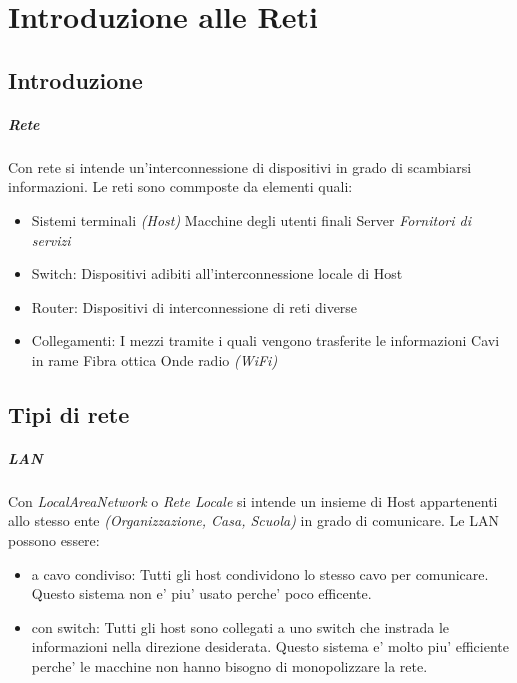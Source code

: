 \chapter{Introduzione alle Reti}

\section{Introduzione}

\paragraph{Rete}

Con rete si intende un'interconnessione di dispositivi in grado di scambiarsi informazioni.
Le reti sono commposte da elementi quali:
\begin{itemize}
    \item Sistemi terminali \textit{(Host)}
    \subitem Macchine degli utenti finali
    \subitem Server \textit{Fornitori di servizi}
    \item Switch: Dispositivi adibiti all'interconnessione locale di Host
    \item Router: Dispositivi di interconnessione di reti diverse
    \item Collegamenti: I mezzi tramite i quali vengono trasferite le informazioni
    \subitem Cavi in rame
    \subitem Fibra ottica
    \subitem Onde radio \textit{(WiFi)}
\end{itemize}

\section{Tipi di rete}
\paragraph{LAN}
Con \textit{LocalAreaNetwork} o \textit{Rete Locale} si intende un insieme di Host appartenenti allo stesso ente \textit{(Organizzazione, Casa, Scuola)} in grado di comunicare.\newline
Le LAN possono essere:
\begin{itemize}
    \item a cavo condiviso: Tutti gli host condividono lo stesso cavo per comunicare.
    Questo sistema non e' piu' usato perche' poco efficente.
    \item con switch: Tutti gli host sono collegati a uno switch che instrada le informazioni nella direzione desiderata.
    Questo sistema e' molto piu' efficiente perche' le macchine non hanno bisogno di monopolizzare la rete.
\end{itemize}
